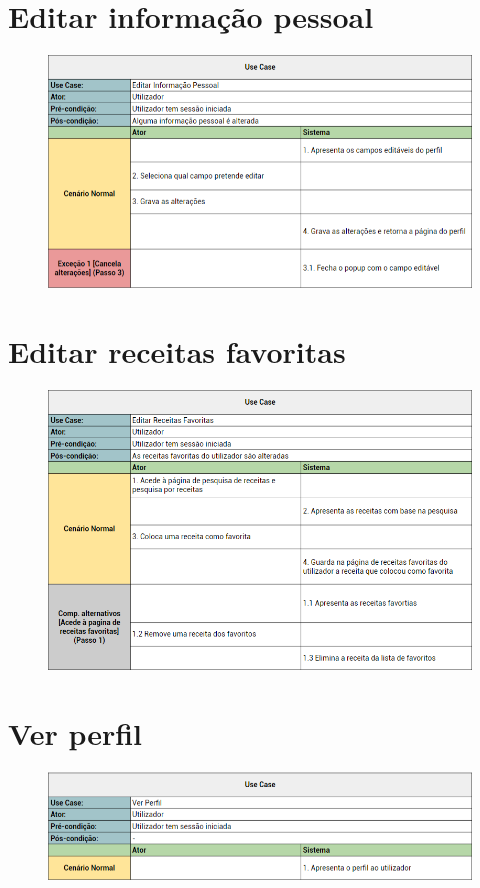 \documentclass[a4paper]{report}
\begin{document}
    \section{Editar informação pessoal}
        \begin{figure}[H]
        \centering
            \includegraphics[width=\textwidth]{images/usecases/editar_utilizador.png}
        \end{figure}

    \section{Editar receitas favoritas}
        \begin{figure}[H]
        \centering
            \includegraphics[width=\textwidth]{images/usecases/editar_receitas_favoritas.png}
        \end{figure}

    \section{Ver perfil}
        \begin{figure}[H]
        \centering
            \includegraphics[width=\textwidth]{images/usecases/ver_perfil.png}
        \end{figure}
\end{document}
